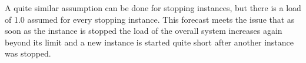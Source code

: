 A quite similar assumption can be done for stopping instances, but there is a load of 1.0 assumed for every stopping instance. This forecast meets the issue that as soon as the instance is stopped the load of the overall system increases again beyond its limit and a new instance is started quite short after another instance was stopped.

%
%
%
%
